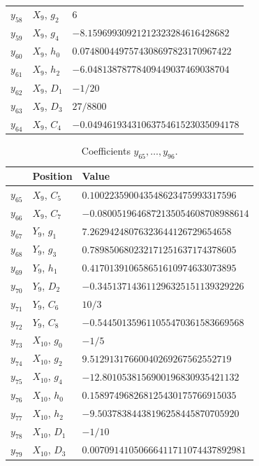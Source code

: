 \documentclass[12pt]{article}
\begin{document}
\begin{table}[H]
\begin{tabular}{lll}
$y_{58}$ & $X_{9}$, $g_{2}$ & $6$ \\
$y_{59}$ & $X_{9}$, $g_{4}$ & $-8.15969930921212323284616428682$ \\
$y_{60}$ & $X_{9}$, $h_{0}$ & $0.0748004497574308697823170967422$ \\
$y_{61}$ & $X_{9}$, $h_{2}$ & $-6.04813878778409449037469038704$ \\
$y_{62}$ & $X_{9}$, $D_{1}$ & $-1/20$ \\
$y_{63}$ & $X_{9}$, $D_{3}$ & $27/8800$ \\
$y_{64}$ & $X_{9}$, $C_{4}$ & $-0.0494619343106375461523035094178$ \\ \hline
\end{tabular}
\end{table}

\begin{table}[H]
\centering\small
\caption{Coefficients $y_{65},\ldots,y_{96}$.}\label{tab:yc}
\begin{tabular}{lll}
\hline
 & Position & Value \\ \hline
$y_{65}$ & $X_{9}$, $C_{5}$ & $0.100223590043548623475993317596$ \\
$y_{66}$ & $X_{9}$, $C_{7}$ & $-0.0800519646872135054608708988614$ \\
$y_{67}$ & $Y_{9}$, $g_{1}$ & $7.26294248076323644126729654658$ \\
$y_{68}$ & $Y_{9}$, $g_{3}$ & $0.789850680232171251637174378605$ \\
$y_{69}$ & $Y_{9}$, $h_{1}$ & $0.417013910658651610974633073895$ \\
$y_{70}$ & $Y_{9}$, $D_{2}$ & $-0.345137143611296325151139329226$ \\
$y_{71}$ & $Y_{9}$, $C_{6}$ & $10/3$ \\
$y_{72}$ & $Y_{9}$, $C_{8}$ & $-0.544501359611055470361583669568$ \\
$y_{73}$ & $X_{10}$, $g_{0}$ & $-1/5$ \\
$y_{74}$ & $X_{10}$, $g_{2}$ & $9.51291317660040269267562552719$ \\
$y_{75}$ & $X_{10}$, $g_{4}$ & $-12.8010538156900196830935421132$ \\
$y_{76}$ & $X_{10}$, $h_{0}$ & $0.158974968268125430175766915035$ \\
$y_{77}$ & $X_{10}$, $h_{2}$ & $-9.50378384438196258445870705920$ \\
$y_{78}$ & $X_{10}$, $D_{1}$ & $-1/10$ \\
$y_{79}$ & $X_{10}$, $D_{3}$ & $0.00709141050666411711074437892981$ \\

\end{tabular}
\end{table}
\end{document}
